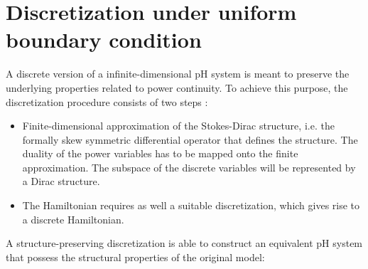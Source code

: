\section{Discretization under uniform boundary condition}
A discrete version of a infinite-dimensional pH system is meant to preserve the underlying properties related to power continuity. To achieve this purpose, the discretization procedure consists of two steps \cite{kotyczka2018weak}:
\begin{itemize}
	\item Finite-dimensional approximation of the Stokes-Dirac structure, i.e. the formally skew symmetric differential operator that defines the structure. The duality of the power variables has to be mapped onto the finite approximation. The subspace of the discrete variables will be represented by a Dirac structure. 
	\item The Hamiltonian requires as well a suitable discretization, which gives rise to a discrete Hamiltonian. 
\end{itemize} 
A structure-preserving discretization is able to construct an equivalent pH system that possess the structural properties of the original model:
